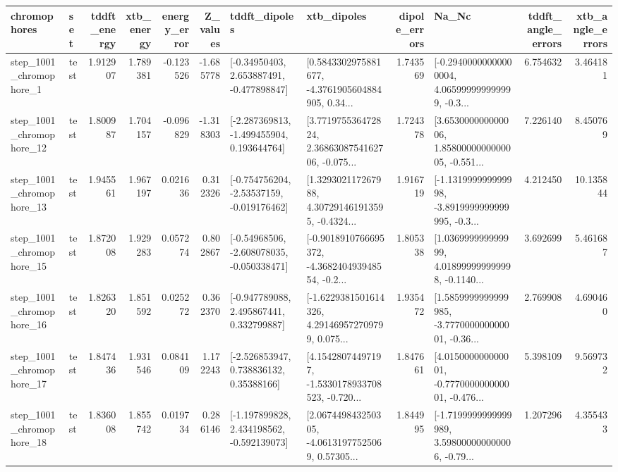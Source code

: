 \begin{tabular}{llrrrrllrlrr}
\toprule
             chromophores &       set &  tddft\_energy &  xtb\_energy &  energy\_error &  Z\_values &                               tddft\_dipoles &                                        xtb\_dipoles &  dipole\_errors &                                              Na\_Nc &  tddft\_angle\_errors &  xtb\_angle\_errors \\
\midrule
  step\_1001\_chromophore\_1 &      test &      1.912907 &    1.789381 &     -0.123526 & -1.685778 &    [-0.34950403, 2.653887491, -0.477898847] &  [0.5843302975881677, -4.3761905604884905, 0.34... &       1.743569 &  [-0.29400000000000004, 4.065999999999999, -0.3... &            6.754632 &          3.464181 \\
 step\_1001\_chromophore\_12 &      test &      1.800987 &    1.704157 &     -0.096829 & -1.318303 &   [-2.287369813, -1.499455904, 0.193644764] &  [3.771975536472824, 2.3686308754162706, -0.075... &       1.724378 &  [3.653000000000006, 1.8580000000000005, -0.551... &            7.226140 &          8.450769 \\
 step\_1001\_chromophore\_13 &      test &      1.945561 &    1.967197 &      0.021636 &  0.312326 &   [-0.754756204, -2.53537159, -0.019176462] &  [1.329302117267988, 4.307291461913595, -0.4324... &       1.916719 &  [-1.131999999999998, -3.8919999999999995, -0.3... &            4.212450 &         10.135844 \\
 step\_1001\_chromophore\_15 &      test &      1.872008 &    1.929283 &      0.057274 &  0.802867 &   [-0.54968506, -2.608078035, -0.050338471] &  [-0.9018910766695372, -4.368240493948554, -0.2... &       1.805338 &  [1.036999999999999, 4.018999999999998, -0.1140... &            3.692699 &          5.461687 \\
 step\_1001\_chromophore\_16 &      test &      1.826320 &    1.851592 &      0.025272 &  0.362370 &    [-0.947789088, 2.495867441, 0.332799887] &  [-1.6229381501614326, 4.291469572709799, 0.075... &       1.935472 &  [1.5859999999999985, -3.777000000000001, -0.36... &            2.769908 &          4.690460 \\
 step\_1001\_chromophore\_17 &      test &      1.847436 &    1.931546 &      0.084109 &  1.172243 &     [-2.526853947, 0.738836132, 0.35388166] &  [4.15428074497197, -1.5330178933708523, -0.720... &       1.847661 &  [4.015000000000001, -0.777000000000001, -0.476... &            5.398109 &          9.569732 \\
 step\_1001\_chromophore\_18 &      test &      1.836008 &    1.855742 &      0.019734 &  0.286146 &   [-1.197899828, 2.434198562, -0.592139073] &  [2.067449843250305, -4.06131977525069, 0.57305... &       1.844995 &  [-1.7199999999999989, 3.598000000000006, -0.79... &            1.207296 &          4.355433 \\

\end{tabular}
